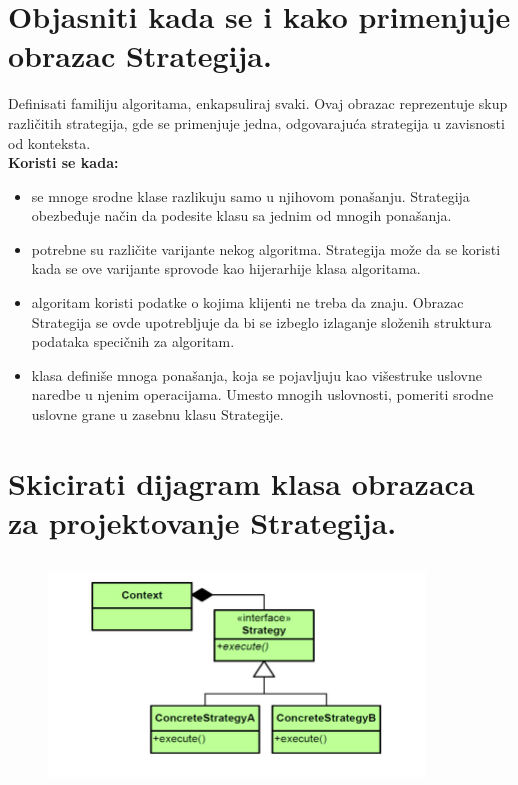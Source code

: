 \documentclass[a4paper]{article}
\begin{document}
\section{Objasniti kada se i kako primenjuje obrazac Strategija.}
  Definisati familiju algoritama, enkapsuliraj svaki. Ovaj obrazac reprezentuje skup različitih
  strategija, gde se primenjuje jedna, odgovarajuća strategija u zavisnosti od konteksta. \\
  \textbf{Koristi se kada:}
  \begin{itemize} 
    \item se mnoge srodne klase razlikuju samo u njihovom ponašanju. 
          Strategija obezbeđuje način da podesite klasu sa jednim od mnogih ponašanja.
    \item potrebne su različite varijante nekog algoritma. 
          Strategija može da se koristi kada se ove varijante sprovode kao hijerarhije klasa algoritama.
    \item algoritam koristi podatke o kojima klijenti ne treba da znaju. 
          Obrazac Strategija se ovde upotrebljuje da bi se izbeglo izlaganje složenih 
          struktura podataka specičnih za algoritam.
    \item klasa definiše mnoga ponašanja, koja se pojavljuju kao višestruke 
          uslovne naredbe u njenim operacijama. Umesto mnogih uslovnosti, 
          pomeriti srodne uslovne grane u zasebnu klasu Strategije.
  \end{itemize}

\section{Skicirati dijagram klasa obrazaca za projektovanje Strategija.}
  \begin{figure}[H]
    \begin{center}
        \includegraphics[width=100mm,height=60mm]{Slike/dp_strategy.png}
    \end{center}
  \end{figure} 
\end{document}
